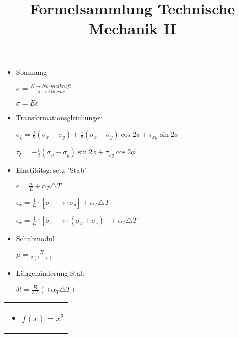 \documentclass{scrartcl}
\begin{document}
	\title{Formelsammlung Technische Mechanik II}
	\date{}
	\author{}
	\maketitle
\large	
\begin{minipage}{0,47 \textwidth}
	\begin{itemize}
        
        \item{Spannung}
        
        $\sigma = \frac{N \rightarrow Normalkraft}{A \rightarrow Flaeche}$
             
        $\sigma = E \epsilon$
        
        \item{Transformationsgleichungen}
        
        $\sigma_\xi = \frac{1}{2}(\sigma_x + \sigma_y) + \frac{1}{2}(\sigma_x - \sigma_y)\cos2\phi+\tau_{xy}\sin2\phi        
        $
        
        $\tau_{\xi} =           -\frac{1}{2}(\sigma_x - \sigma_y)\sin2\phi+\tau_{xy}\cos2\phi$
        
		\item{Elastitätsgesetz "Stab"}
        
        $\epsilon = \frac{\sigma}{E}+\alpha_T\triangle T$
		
		$\epsilon_x = \frac{1}{E}\cdot[\sigma_x - v \cdot \sigma_y] + \alpha_T\triangle T  $
		
    	$	\epsilon_x = \frac{1}{E}\cdot[\sigma_x - v \cdot (\sigma_y + \sigma_z)] + \alpha_T\triangle T  
    	$	

		\item{Schubmodul}
	
		$\mu = \frac{E}{2(1+v)} $

        \item{Längenänderung Stab}
        
        $\delta l = \frac{Fl}{EA} (+   \alpha_T\triangle T)$

	\end{itemize}
\end{minipage}%
\hfill
\begin{minipage}{0,45 \textwidth}
	\begin{tabular}{|p{\textwidth}}
		\begin{itemize}
			\item $f(x) = x^2$
		\end{itemize}
		
	\end{tabular}
\end{minipage}%
\end{document}
